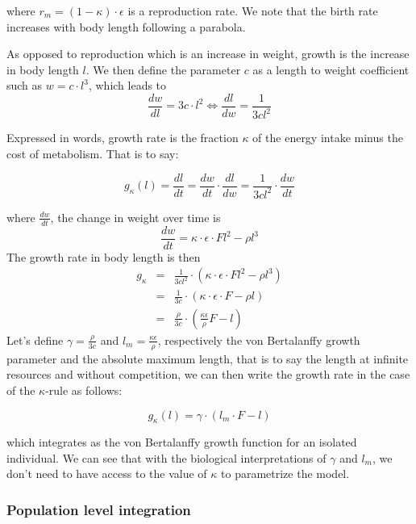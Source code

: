 where $r_{m}=(1-\kappa)\cdot\epsilon$ is a reproduction rate. We
note that the birth rate increases with body length following a parabola. 

As opposed to reproduction which is an increase in weight, growth
is the increase in body length $l$. We then define the parameter
$c$ as a length to weight coefficient such as $w=c\cdot l^{3}$,
which leads to 
\[
\frac{dw}{dl}=3c\cdot l^{2}\Leftrightarrow\frac{dl}{dw}=\frac{1}{3cl^{2}}
\]


Expressed in words, growth rate is the fraction $\kappa$ of the energy
intake minus the cost of metabolism. That is to say:

\[
g_{\kappa}(l)=\frac{dl}{dt}=\frac{dw}{dt}\cdot\frac{dl}{dw}=\frac{1}{3cl^{2}}\cdot\frac{dw}{dt}
\]


where $\frac{dw}{dt}$, the change in weight over time is 
\[
\frac{dw}{dt}=\kappa\cdot\epsilon\cdot Fl^{2}-\rho l^{3}
\]
The growth rate in body length is then 
\begin{eqnarray*}
g_{\kappa} & = & \frac{1}{3cl^{2}}\cdot\left(\kappa\cdot\epsilon\cdot Fl^{2}-\rho l^{3}\right)\\
 & = & \frac{1}{3c}\cdot\left(\kappa\cdot\epsilon\cdot F-\rho l\right)\\
 & = & \frac{\rho}{3c}\cdot\left(\frac{\kappa\epsilon}{\rho}F-l\right)
\end{eqnarray*}
Let's define ${\displaystyle \gamma=\frac{\rho}{3c}}$ and ${\displaystyle
l_{m}=\frac{\kappa\epsilon}{\rho}}$, respectively the von Bertalanffy growth
parameter and the absolute maximum length, that is to say the length at infinite resources and
without competition, we can then write the growth rate in the case
of the $\kappa$-rule as follows:

\begin{equation}
g_{\kappa}(l)=\gamma\cdot\left(l_m\cdot F-l\right)
\label{eq:7}
\end{equation}


which integrates as the von Bertalanffy growth function for an isolated
individual. We can see that with the biological interpretations of
$\gamma$ and $l_m$, we don't need to have access to the value
of $\kappa$ to parametrize the model.

\subsubsection{Population level integration}


